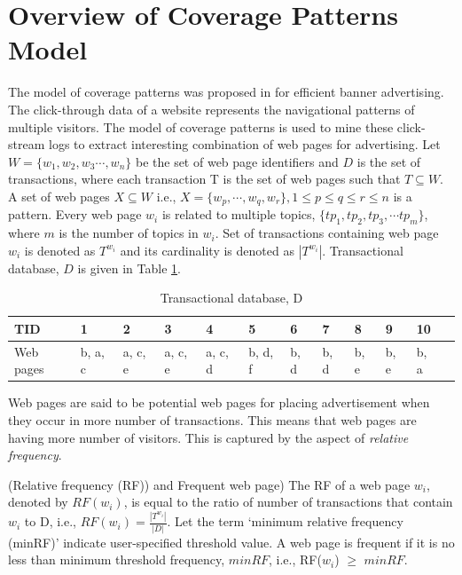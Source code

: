 \section{Overview of Coverage Patterns Model} 
\label{sec:CoveragePatternsModel}
The model of coverage patterns was proposed in \cite{sripada2011coverage, srinivas2014mining} for efficient banner advertising. The click-through data of a website represents the navigational patterns of multiple visitors. The model of coverage patterns is used to mine these click-stream logs to extract interesting combination of web pages for advertising. Let $W=\{w_1,w_2,w_3\cdots,w_n\}$ be the set of web page identifiers and $D$ is the set of transactions, where each transaction T is the set of web pages such that $T \subseteq W$. A set of web pages $X \subseteq W$ i.e., $X=\{w_p,\cdots,w_q,w_r\}, 1\leq p \leq q \leq r \leq n$ is a pattern. Every web page $w_i$ is related to multiple topics, $\{tp_1,tp_2,tp_3,\cdots tp_m\}$, where $m$ is the number of topics in $w_i$. Set of transactions containing web page $w_i$ is denoted as $T^{w_i}$ and its cardinality is denoted as $|T^{w_i}|$.  Transactional database, $D$ is given in Table \ref{tb:transactionalDatabase}.
	
\begin{table}[ht]\centering
\renewcommand{\arraystretch}{1.3}
\caption{Transactional database, D}
\label{tb:transactionalDatabase}
\begin{tabular}{|l|l|l|l|l|l|l|l|l|l|l|l|}
\hline
TID & 1 & 2 & 3 & 4 & 5 & 6 & 7 & 8 & 9 & 10 \\
\hline
Web pages & b, a, c & a, c, e & a, c, e & a, c, d & b, d, f & b, d & b, d & b, e & b, e & b, a \\
\hline
\end{tabular}
\end{table}
	Web pages are said to be potential web pages for placing advertisement when they occur in more number of transactions. This means that web pages are having more number of visitors. This is captured by the aspect of \emph{relative frequency}.  

\begin{mydef}
(Relative frequency (RF)) and Frequent web page)  The RF of a web page  $w_i$,  denoted by  $RF(w_i)$, is equal to the ratio of number of transactions that contain $w_i$ to D, i.e., $RF(w_i) = \frac{|T^{w_i}|}{|D|}$. Let the term `minimum relative frequency (minRF)' indicate user-specified threshold value. A web page is frequent if it is no less than minimum threshold frequency, $minRF$, i.e., RF($w_i$) $\geq$ $minRF$. 
\end{mydef}
	
